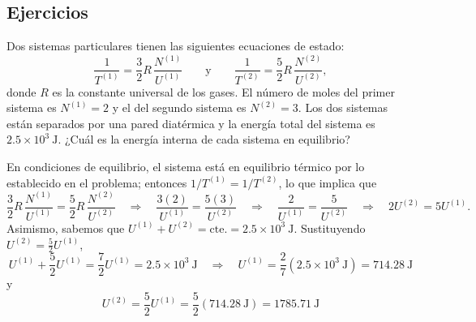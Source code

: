 \subsection*{Ejercicios}

\begin{ejercicio}[P.\,2.6.3]
  Dos sistemas particulares tienen las siguientes ecuaciones de estado:
  \begin{equation*}
    \frac{1}{T^{(1)}}=\frac{3}{2}R\,\frac{N^{(1)}}{U^{(1)}}
    \qquad\text{y}\qquad
    \frac{1}{T^{(2)}}=\frac{5}{2}R\,\frac{N^{(2)}}{U^{(2)}},
  \end{equation*}
  donde $R$ es la constante universal de los gases. El número de moles del primer sistema es
  $N^{(1)}=2$ y el del segundo sistema es $N^{(2)}=3$. Los dos sistemas están separados por una
  pared diatérmica y la energía total del sistema es $2.5\times10^{3}\ \mathrm{J}$. ¿Cuál es la
  energía interna de cada sistema en equilibrio?
\end{ejercicio}

\begin{solucion}
  En condiciones de equilibrio, el sistema está en equilibrio térmico por lo establecido en el
  problema; entonces $1/T^{(1)}=1/T^{(2)}$, lo que implica que
  \begin{equation*}
    \frac{3}{2}R\,\frac{N^{(1)}}{U^{(1)}}=\frac{5}{2}R\,\frac{N^{(2)}}{U^{(2)}}
    \quad\Longrightarrow\quad
    \frac{3(2)}{U^{(1)}}=\frac{5(3)}{U^{(2)}}
    \quad\Longrightarrow\quad
    \frac{2}{U^{(1)}}=\frac{5}{U^{(2)}}
    \quad\Longrightarrow\quad
    2U^{(2)}=5U^{(1)}.
  \end{equation*}
  Asimismo, sabemos que $U^{(1)}+U^{(2)}=\text{cte.}=2.5\times10^{3}\ \mathrm{J}$. Sustituyendo
  $U^{(2)}=\frac{5}{2}U^{(1)}$,
  \begin{equation*}
    U^{(1)}+\frac{5}{2}U^{(1)}=\frac{7}{2}U^{(1)}=2.5\times10^{3}\ \mathrm{J}
    \quad\Longrightarrow\quad
    \boxed{U^{(1)}=\frac{2}{7}\left(2.5\times10^{3}\ \mathrm{J}\right)=714.28\ \mathrm{J}}
  \end{equation*}
  y
  \begin{equation*}
    \boxed{U^{(2)}=\frac{5}{2}U^{(1)}=\frac{5}{2}\left(714.28\ \mathrm{J}\right)=1785.71\ \mathrm{J}}
  \end{equation*}
\end{solucion}

